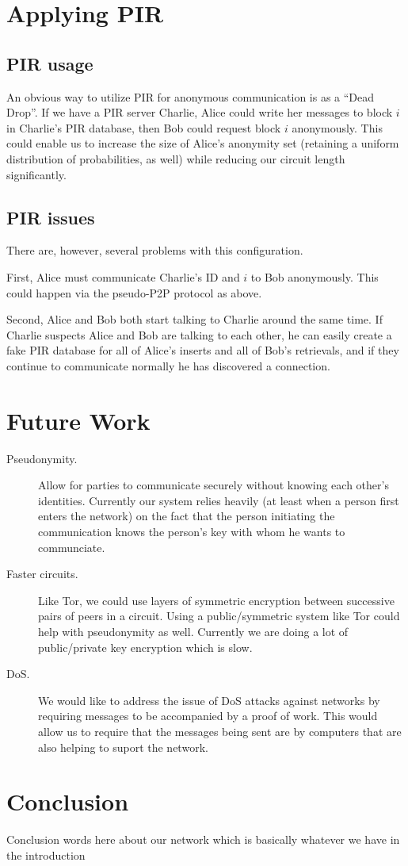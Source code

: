 \documentclass[twocolumn,11pt,english]{paper}
\begin{document}
\section{Applying PIR}
\subsection{PIR usage}
An obvious way to utilize PIR for anonymous communication is as a ``Dead Drop''. If we have a PIR server Charlie, Alice could write her messages to block $i$ in Charlie's PIR database, then Bob could request block $i$ anonymously. This could enable us to increase the size of Alice's anonymity set (retaining a uniform distribution of probabilities, as well) while reducing our circuit length significantly. 

\subsection{PIR issues}
There are, however, several problems with this configuration.

First, Alice must communicate Charlie's ID and $i$ to Bob anonymously. This could happen via the pseudo-P2P protocol as above. 

Second, Alice and Bob both start talking to Charlie around the same time. If Charlie suspects Alice and Bob are talking to each other, he can easily create a fake PIR database for all of Alice's inserts and all of Bob's retrievals, and if they continue to communicate normally he has discovered a connection. 


\section{Future Work}
\begin{description}
\item[Pseudonymity.] Allow for parties to communicate securely without knowing each other's identities. Currently our system relies heavily (at least when a person first enters the network) on the fact that the person initiating the communication knows the person's key with whom he wants to communciate.

\item[Faster circuits.] Like Tor, we could use layers of symmetric encryption between successive pairs of peers in a circuit. Using a public/symmetric system like Tor could help with pseudonymity as well. Currently we are doing a lot of public/private key encryption which is slow.

\item[DoS.] We would like to address the issue of DoS attacks against networks by requiring messages to be accompanied by a proof of work. This would allow us to require that the messages being sent are by computers that are also helping to suport the network.
\end{description}

\section{Conclusion}
Conclusion words here about our network which is basically whatever we have in the introduction

\newpage



\end{document}
